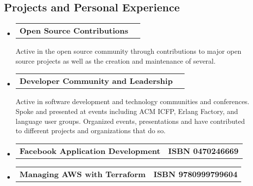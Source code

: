 \documentclass[10pt,letterpaper]{article}
\makeatletter
\newcommand{\headerrow}[2]
{\begin{tabular*}{\linewidth}{l@{\extracolsep{\fill}}r}
  #1 &
  #2 \\
\end{tabular*}}
\makeatother
\begin{document}
\subsection*{Projects and Personal Experience}

\begin{itemize}
  \parskip=0.1em

  \item
  \headerrow
    {\textbf{Open Source Contributions}}
    {\textbf{}}
    Active in the open source community through contributions to major open source projects as well as the creation and maintenance of several.
  \item
  \headerrow
    {\textbf{Developer Community and Leadership}}
    {\textbf{}}
    Active in software development and technology communities and conferences. Spoke and presented at events including ACM ICFP, Erlang Factory, and language user groups. Organized events, presentations and have contributed to different projects and organizations that do so.
  \item
  \headerrow
    {\textbf{Facebook Application Development}}
    {\textbf{ISBN 0470246669}}
  \item
  \headerrow
    {\textbf{Managing AWS with Terraform}}
    {\textbf{ISBN 9780999799604}}
\end{itemize}
\end{document}
